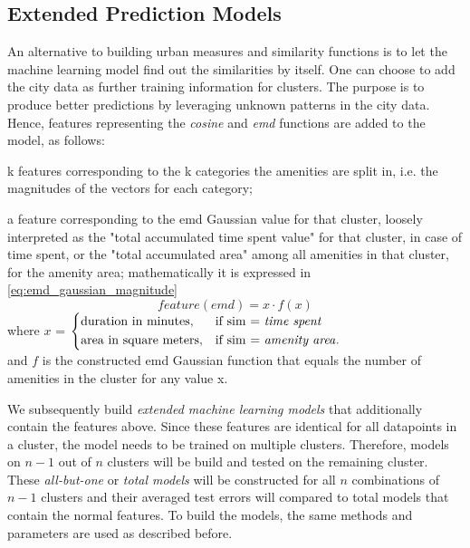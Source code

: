 	\subsection{Extended Prediction Models}
	An alternative to building urban measures and similarity functions is to let the machine learning model find out the similarities by itself. 
	One can choose to add the city data as further training information for clusters. The purpose is to produce better predictions by leveraging unknown patterns in the city data. Hence, features representing the \textit{cosine} and \textit{emd} functions are added to the model, as follows: 
	\begin{romanlist}
		\item k features corresponding to the k categories the amenities are split in, i.e. the magnitudes of the vectors for each category;
		\item a feature corresponding to the emd Gaussian value for that cluster, loosely interpreted as the "total accumulated time spent value" for that cluster, in case of time spent, or the "total accumulated area" among all amenities in that cluster, for the amenity area; mathematically it is expressed in \cref{eq:emd_gaussian_magnitude}
		\begin{equation}
		feature(emd)=x \cdot f(x)
		\label{eq:emd_gaussian_magnitude}
		\end{equation}
		{\centering
			where $x$ = 
			$
			\begin{dcases}
			\text{duration in minutes}, & \text{if sim = \textit{time spent}} \\
			\text{area in square meters}, & \text{if sim = \textit{amenity area}}.
			\end{dcases}
			$ \\
			
			and $f$ is the constructed emd Gaussian function that equals the number of amenities in the cluster for any value x.}
	\end{romanlist}
	
	We subsequently build \textit{extended machine learning models} that additionally contain the features above. Since these features are identical for all datapoints in a cluster, the model needs to be trained on multiple clusters. Therefore, models on $n-1$ out of $n$ clusters will be build and tested on the remaining cluster. These \textit{all-but-one} or \textit{total models} will be constructed for all $n$ combinations of $n-1$ clusters and their averaged test errors will compared to total models that contain the normal features. To build the models, the same methods and parameters are used as described before.
	

